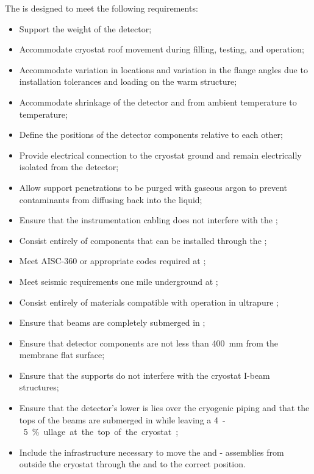The  is designed to meet the following  requirements:
\begin{itemize}
 \setlength\itemsep{1mm}
\setlength{\parsep}{1mm}
\setlength{\itemsep}{-5mm}
\item Support the weight of the detector;
\item Accommodate cryostat roof movement during filling, testing, and operation;
\item Accommodate variation in \fdth locations and
  variation in the flange angles due to installation tolerances and
  loading on the warm structure;
\item Accommodate shrinkage of the detector and  from ambient
  temperature to  temperature;
\item Define the positions of the detector components relative to each other; 
\item Provide electrical connection to the cryostat ground and remain electrically isolated from the detector;
\item Allow support penetrations to be purged with gaseous argon to prevent contaminants from diffusing back into the liquid; 
\item Ensure that the instrumentation cabling does not interfere with the ;
\item Consist entirely of components that can  
be installed through the ;
\item Meet AISC-360 or appropriate codes required at ; 
\item Meet seismic requirements one mile underground at ;
\item Consist entirely of materials compatible %
with operation in ultrapure ;
\item Ensure that beams are completely submerged in ;  
\item Ensure that detector components are not less than \SI{400}{mm} from the membrane flat surface;
\item Ensure that the supports do not interfere with the cryostat I-beam structures;
\item Ensure that the detector's lower  is lies over the cryogenic piping and that the tops of the  beams are submerged in  while leaving a \SI{4}-\SI{5}{\%} ullage at the top of the cryostat; 
\item Include the infrastructure necessary to move the  and
  - assemblies from outside the cryostat through the
   and to the correct position.
\end{itemize}

